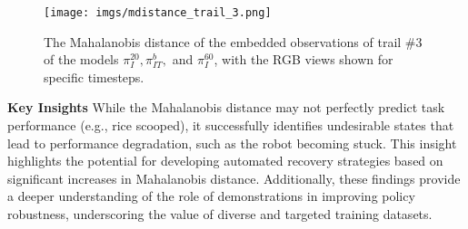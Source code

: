 \begin{figure*}[ht]
    \centering
    \texttt{[image: imgs/mdistance\_trail\_3.png]}
    \caption{The Mahalanobis distance of the embedded observations of trail $\#3$ of the models $\pi_I^{20}, \pi_{IT}^b,$ and $\pi_I^{60}$, with the RGB views shown for specific timesteps. }
    \label{fig:mdistancet03}
\end{figure*}

\textbf{Key Insights}
While the Mahalanobis distance may not perfectly predict task performance (e.g., rice scooped), it successfully identifies undesirable states that lead to performance degradation, such as the robot becoming stuck. This insight highlights the potential for developing automated recovery strategies based on significant increases in Mahalanobis distance. Additionally, these findings provide a deeper understanding of the role of demonstrations in improving policy robustness, underscoring the value of diverse and targeted training datasets.